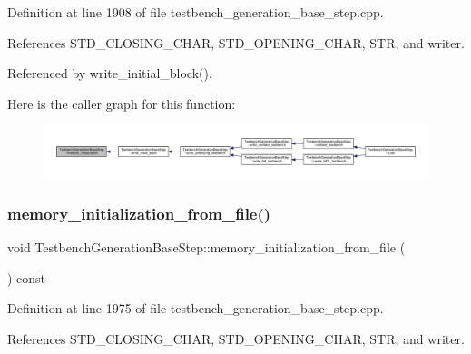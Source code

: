 Definition at line 1908 of file testbench\+\_\+generation\+\_\+base\+\_\+step.\+cpp.



References S\+T\+D\+\_\+\+C\+L\+O\+S\+I\+N\+G\+\_\+\+C\+H\+AR, S\+T\+D\+\_\+\+O\+P\+E\+N\+I\+N\+G\+\_\+\+C\+H\+AR, S\+TR, and writer.



Referenced by write\+\_\+initial\+\_\+block().

Here is the caller graph for this function\+:
\nopagebreak
\begin{figure}[H]
\begin{center}
\leavevmode
\includegraphics[width=350pt]{dc/d02/classTestbenchGenerationBaseStep_abf62b47a373a3fcd67d892b8f92e0bd9_icgraph}
\end{center}
\end{figure}
\mbox{\label{classTestbenchGenerationBaseStep_aee6bfb330acf36f11d05c4bedffa4885}} 
\subsubsection{\texorpdfstring{memory\+\_\+initialization\+\_\+from\+\_\+file()}{memory\_initialization\_from\_file()}}
{\footnotesize\ttfamily void Testbench\+Generation\+Base\+Step\+::memory\+\_\+initialization\+\_\+from\+\_\+file (\begin{DoxyParamCaption}{ }\end{DoxyParamCaption}) const\hspace{0.3cm}{\ttfamily [protected]}}



Definition at line 1975 of file testbench\+\_\+generation\+\_\+base\+\_\+step.\+cpp.



References S\+T\+D\+\_\+\+C\+L\+O\+S\+I\+N\+G\+\_\+\+C\+H\+AR, S\+T\+D\+\_\+\+O\+P\+E\+N\+I\+N\+G\+\_\+\+C\+H\+AR, S\+TR, and writer.



